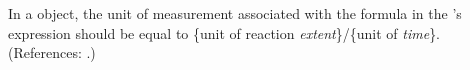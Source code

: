In a \KineticLaw object, the unit of measurement associated with the
formula in the \KineticLaw's  expression should be equal to
\{unit of reaction \emph{extent}\}/\{unit of \emph{time}\}.  (References: .)
